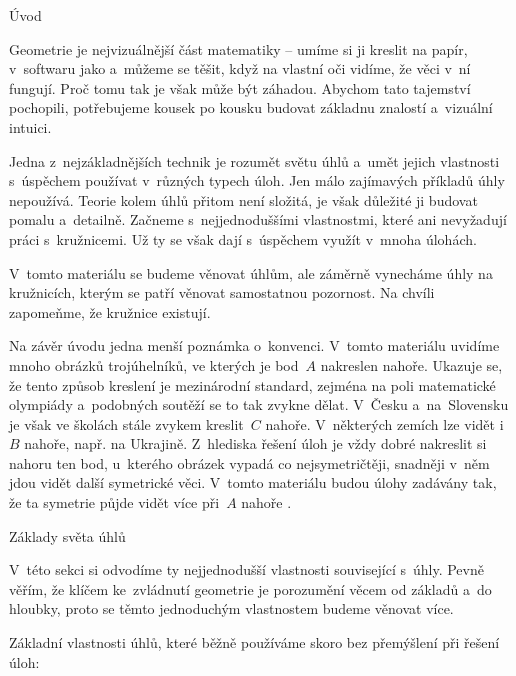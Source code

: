 





\sec Úvod

Geometrie je nejvizuálnější část matematiky -- umíme si ji kreslit na papír, v~softwaru jako  a~můžeme se těšit, když na vlastní oči vidíme, že věci v~ní fungují. Proč tomu tak je však může být záhadou. Abychom tato tajemství pochopili, potřebujeme kousek po kousku budovat základnu znalostí a~vizuální intuici.

Jedna z~nejzákladnějších technik je rozumět světu úhlů a~umět jejich vlastnosti s~úspěchem používat v~různých typech úloh. Jen málo zajímavých příkladů úhly nepoužívá. Teorie kolem úhlů přitom není složitá, je však důležité ji budovat pomalu a~detailně. Začneme s~nejjednoduššími vlastnostmi, které ani nevyžadují práci s~kružnicemi. Už ty se však dají s~úspěchem využít v~mnoha úlohách.

V~tomto materiálu se budeme věnovat úhlům, ale záměrně vynecháme úhly na kružnicích, kterým se patří věnovat samostatnou pozornost. Na chvíli zapomeňme, že kružnice existují.

Na závěr úvodu jedna menší poznámka o~konvenci. V~tomto materiálu uvidíme mnoho obrázků trojúhelníků, ve kterých je bod~$A$ nakreslen nahoře. Ukazuje se, že tento způsob kreslení je mezinárodní standard, zejména na poli matematické olympiády a~podobných soutěží se to tak zvykne dělat. V~Česku a~na~Slovensku je však ve školách stále zvykem kreslit~$C$ nahoře. V~některých zemích lze vidět i~$B$ nahoře, např. na Ukrajině. Z~hlediska řešení úloh je vždy dobré nakreslit si nahoru ten bod, u~kterého obrázek vypadá co nejsymetričtěji, snadněji v~něm jdou vidět další symetrické věci. V~tomto materiálu budou úlohy zadávány tak, že ta symetrie půjde vidět více při~$A$ nahoře \SlightSmile.

\sec Základy světa úhlů

V~této sekci si odvodíme ty nejjednodušší vlastnosti související s~úhly. Pevně věřím, že klíčem ke~zvládnutí geometrie je porozumění věcem od základů a~do hloubky, proto se těmto jednoduchým vlastnostem budeme věnovat více.

Základní vlastnosti úhlů, které běžně používáme skoro bez přemýšlení při řešení úloh:

